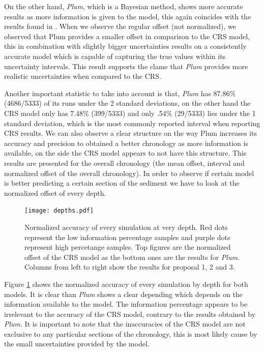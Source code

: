 \documentclass [10pt] {article}
\begin{document}
On the other hand, \textit{Plum}, which is a Bayesian method, shows more accurate results as more information is given to the model, this again coincides with the results found in \citet{Blaauw2018}. 
When we observe the regular offset (not normalized), we observed that Plum provides a smaller offset in comparison to the CRS model, this in combination with slightly bigger uncertainties results on a consistently accurate model which is capable of capturing the true values within its uncertainty intervals. 
This result supports the clame that \textit{Plum} provides more realistic uncertainties when compared to the CRS. 



	Another important statistic to take into account is that, \textit{Plum} has 87.86\% (4686/5333) of its runs under the 2 standard deviations, on the other hand the CRS model only has 7.48\% (399/5333) and only .54\% (29/5333) lies under the 1 standard deviation, which is the most commonly reported interval when reporting CRS results.
We can also observe a clear structure on the way Plum increases its accuracy and precision to obtained a better chronology as more information is available, on the side the CRS model appears to not have this structure. 
This results are presented for the overall chronology (the mean offset, interval and normalized offset of the overall chronology). In order to observe if certain model is better predicting a certain section of the sediment we  have to look at the normalized offset of every depth. 


\begin{figure}[!]
	\begin{centering}
		\texttt{[image: depths.pdf]}
		\caption{Normalized accuracy of every simulation at very depth. Red dots represent the low information percentage samples and purple dots represent high percetange samples. Top figures are the normalized offset of the CRS model as the bottom ones are the results for \textit{Plum}. Columns from left to right show the results for proposal 1, 2 and 3.}
		\label{fig:depths}
	\end{centering}
\end{figure}

Figure \ref{fig:depths} shows the normalized accuracy of every simulation by depth for both models.
It is clear than \textit{Plum} shows a clear depending which depends on the information available to the model.
The information percentage appears to be irrelevant to the accuracy of the CRS model, contrary to the results obtained by \textit{Plum}.
It is important to note that the inaccuracies of the CRS model are not exclusive to any particular sections of the chronology, this is most likely cause by the small uncertainties provided by the model.  
\end{document}
